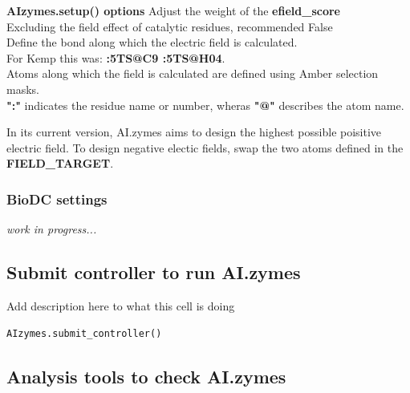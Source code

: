 \documentclass[10pt]{extarticle}
\begin{document}
\textbf{AIzymes.setup() options}
 Adjust the weight of the \textbf{efield\_score}\\        
 Excluding the field effect of catalytic residues, recommended False\\    
 Define the bond along which the electric field is calculated.\\ 
\makebox[3.5cm][l]{} For Kemp this was: \textbf{:5TS@C9 :5TS@H04}.\\
\makebox[3.5cm][l]{} Atoms along which the field is calculated are defined using Amber selection masks.\\
\makebox[3.5cm][l]{} \textbf{":"} indicates the residue name or number, wheras \textbf{"@"} describes the atom name.\\ 

\begin{tcolorbox}[colback=mpgAccentBlue!20!white,colframe=mpgAccentBlue!80!black,title=Note]
In its current version, AI.zymes aims to design the highest possible poisitive electric field.
To design negative electic fields, swap the two atoms defined in the \textbf{FIELD\_TARGET}.
\end{tcolorbox}

\subsubsection{BioDC settings}

\textit{work in progress...}

\subsection{Submit controller to run AI.zymes}

Add description here to what this cell is doing

\vspace*{0.5\baselineskip}
\begin{lstlisting}[basicstyle=\color{black}\fontsize{9}{11}\selectfont\ttfamily, frame=single, rulecolor=\color{black}, breaklines=true]
AIzymes.submit_controller()              
\end{lstlisting}
\vspace*{0.5\baselineskip}

\subsection{Analysis tools to check AI.zymes}
\end{document}
